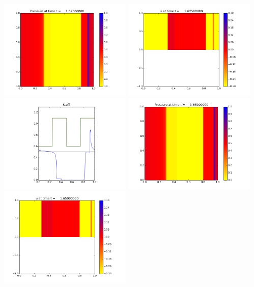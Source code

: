 \documentclass[11pt]{article}
\begin{document}
\vskip 10pt 
\includegraphics[width=0.475\textwidth]{frame0065fig0.png}
\includegraphics[width=0.475\textwidth]{frame0065fig1.png}
\vskip 10pt 
\includegraphics[width=0.475\textwidth]{frame0065fig3.png}
\vskip 10pt 
\includegraphics[width=0.475\textwidth]{frame0066fig0.png}
\includegraphics[width=0.475\textwidth]{frame0066fig1.png}
\end{document}
